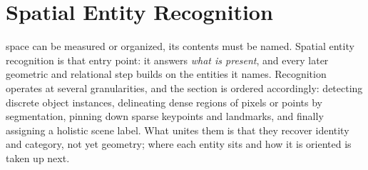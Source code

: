 
\section{Spatial Entity Recognition}
\label{sec:entity_recognition}

 space can be measured or organized, its contents must be named. Spatial entity recognition is that entry point: it answers \emph{what is present}, and every later geometric and relational step builds on the entities it names. Recognition operates at several granularities, and the section is ordered accordingly: detecting discrete object instances, delineating dense regions of pixels or points by segmentation, pinning down sparse keypoints and landmarks, and finally assigning a holistic scene label. What unites them is that they recover identity and category, not yet geometry; where each entity sits and how it is oriented is taken up next.


















